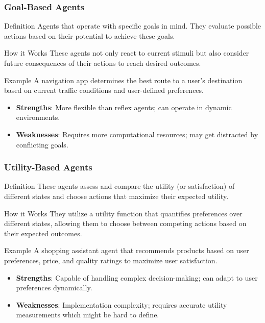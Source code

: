 \documentclass[aspectratio=169]{beamer}
\begin{document}
\begin{frame}[fragile]
    \frametitle{Goal-Based Agents}
    \begin{block}{Definition}
        Agents that operate with specific goals in mind. They evaluate possible actions based on their potential to achieve these goals.
    \end{block}
    \begin{block}{How it Works}
        These agents not only react to current stimuli but also consider future consequences of their actions to reach desired outcomes.
    \end{block}
    \begin{block}{Example}
        A navigation app determines the best route to a user's destination based on current traffic conditions and user-defined preferences.
    \end{block}
    \begin{itemize}
        \item \textbf{Strengths}: More flexible than reflex agents; can operate in dynamic environments.
        \item \textbf{Weaknesses}: Requires more computational resources; may get distracted by conflicting goals.
    \end{itemize}
\end{frame}

\begin{frame}[fragile]
    \frametitle{Utility-Based Agents}
    \begin{block}{Definition}
        These agents assess and compare the utility (or satisfaction) of different states and choose actions that maximize their expected utility.
    \end{block}
    \begin{block}{How it Works}
        They utilize a utility function that quantifies preferences over different states, allowing them to choose between competing actions based on their expected outcomes.
    \end{block}
    \begin{block}{Example}
        A shopping assistant agent that recommends products based on user preferences, price, and quality ratings to maximize user satisfaction.
    \end{block}
    \begin{itemize}
        \item \textbf{Strengths}: Capable of handling complex decision-making; can adapt to user preferences dynamically.
        \item \textbf{Weaknesses}: Implementation complexity; requires accurate utility measurements which might be hard to define.
    \end{itemize}
\end{frame}
\end{document}
